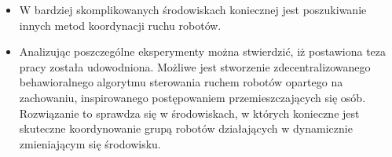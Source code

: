 \begin{frame}
{\begin{itemize}
	\item W bardziej skomplikowanych środowiskach koniecznej jest poszukiwanie innych metod koordynacji ruchu robotów.
	
	\item Analizując poszczególne eksperymenty można stwierdzić, iż postawiona teza pracy została udowodniona. Możliwe jest stworzenie zdecentralizowanego behawioralnego algorytmu sterowania ruchem robotów opartego na zachowaniu, inspirowanego postępowaniem przemieszczających się osób. Rozwiązanie to sprawdza się w środowiskach, w których konieczne jest skuteczne koordynowanie grupą robotów działających w dynamicznie zmieniającym się środowisku.
	
\end{itemize}	
}
\end{frame}
	


%
%
%	

